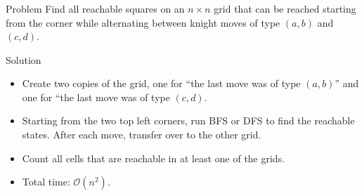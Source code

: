 \begin{frame}
  \frametitle{\problemtitle}
  \begin{block}{Problem}
    Find all reachable squares on an $n\times n$ grid that can be reached
    starting from the corner while alternating between knight moves of type
    $(a,b)$ and $(c,d)$.
  \end{block}
  \pause
  \begin{block}{Solution}
    \begin{itemize}
      \item Create two copies of the grid, one for ``the last move was of type
        $(a,b)$'' and one for ``the last move was of type $(c,d)$.
      \item Starting from the two top left corners, run BFS or DFS to find the reachable states.
        After each move, transfer over to the other grid.
      \item Count all cells that are reachable in at least one of the grids.
      \item Total time: $\mathcal{O}(n^2)$.
    \end{itemize}
  \end{block}
  \pause
  \solvestats
\end{frame}
